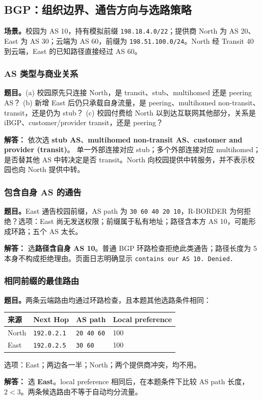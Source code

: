 \documentclass[11pt,a4paper,fontset=fandol]{ctexart}
\renewcommand{\exercisequestion}[2]{%
  \Needspace{5\baselineskip}%
  \subsubsection{#2}\label{exercise:#1}%
}
\renewenvironment{checkedsolution}
  {\par\nopagebreak[4]\textbf{解答：}\ignorespaces}
  {\par}
\begin{document}
\subsection{BGP：组织边界、通告方向与选路策略}

\textbf{场景。}校园为 AS 10，持有模拟前缀 \texttt{198.18.4.0/22}；提供商 North 为 AS 20、East 为 AS 30；云端为 AS 60，前缀为 \texttt{198.51.100.0/24}。North 经 Transit 40 到云端，East 的已知路径直接经过 AS 60。

\exercisequestion{SC2008-HW03-Q13}{AS 类型与商业关系}
\textbf{题目。}(a) 校园原先只连接 North，是 transit、stub、multihomed 还是 peering AS？
(b) 新增 East 后仍只承载自身流量，是 peering、multihomed non-transit、transit，还是仍为 stub？
(c) 校园付费给 North 以到达互联网其他部分，关系是 iBGP、customer/provider transit，还是 peering？
\begin{checkedsolution}
依次选 \textbf{stub AS}、\textbf{multihomed non-transit AS}、\textbf{customer and provider (transit)}。
单一外部连接对应 stub；多个外部连接对应 multihomed；是否替其他 AS 中转决定是否 transit。North 向校园提供中转服务，并不表示校园也向 North 提供中转。
\end{checkedsolution}

\exercisequestion{SC2008-HW03-Q14}{包含自身 AS 的通告}
\textbf{题目。}East 通告校园前缀，AS path 为 \texttt{30 60 40 20 10}，R-BORDER 为何拒绝？选项：East 尚无发送权限；前缀属于私有地址；路径含本方 AS 10，可能形成环路；五个 AS 太长。
\begin{checkedsolution}
选\textbf{路径含自身 AS 10}。普通 BGP 环路检查拒绝此类通告；路径长度为 5 本身不构成拒绝理由。页面日志明确显示 \texttt{contains our AS 10. Denied.}
\end{checkedsolution}

\exercisequestion{SC2008-HW03-Q15}{相同前缀的最佳路由}
\textbf{题目。}两条云端路由均通过环路检查，且本题其他选路条件相同：
\begin{center}
\small
\begin{tabular}{@{}llll@{}}
\toprule
来源 & Next Hop & AS path & Local preference \\
\midrule
North & \texttt{192.0.2.1} & \texttt{20 40 60} & 100 \\
East & \texttt{192.0.2.5} & \texttt{30 60} & 100 \\
\bottomrule
\end{tabular}
\end{center}
选项：East；两边各一半；North；两个提供商冲突，均不用。
\begin{checkedsolution}
选 \textbf{East}。local preference 相同后，在本题条件下比较 AS path 长度，$2<3$。两条候选路由不等于自动均分流量。
\end{checkedsolution}
\end{document}
